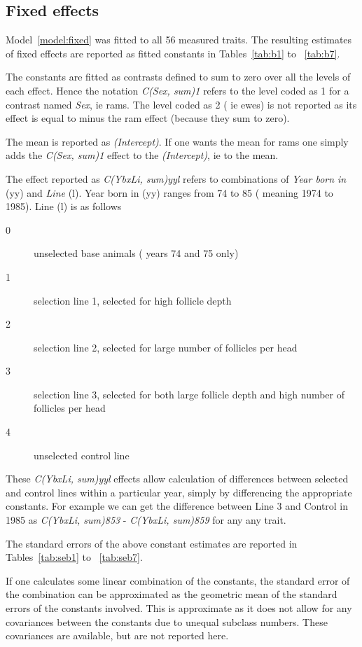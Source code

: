 \documentclass[titlepage]{article}  %
\begin{document}
\subsection{Fixed effects}
Model~\ref{model:fixed} was fitted to all 56 measured traits. The resulting estimates of fixed effects are reported as fitted constants in Tables~\ref{tab:b1} to ~\ref{tab:b7}.







 The constants are fitted as contrasts defined to sum to zero over all the levels of each effect. Hence the notation {\em C(Sex, sum)1} refers to the level coded as 1 for a contrast named {\em Sex}, ie rams. The level coded as 2 ( ie ewes) is not reported as its effect is equal to minus the ram effect (because they sum to zero).

The mean is reported as {\em (Intercept)}. If one wants the mean for rams one simply adds the {\em C(Sex, sum)1} effect to the {\em (Intercept)}, ie to the mean.

The effect reported as {\em C(YbxLi, sum)yyl} refers to combinations of {\em Year born in} (yy) and {\em Line} (l).  Year born in (yy) ranges from 74 to 85 ( meaning 1974 to 1985). Line (l) is as follows
\begin{description}
\item[0] unselected base animals ( years 74 and 75 only)
\item[1] selection line 1, selected for high follicle depth
\item[2] selection line 2, selected for large number of follicles per head
\item[3] selection line 3, selected for both large follicle depth and high number of follicles per head
\item[4] unselected control line
\end{description}

These {\em C(YbxLi, sum)yyl} effects allow calculation of differences between selected and control lines within a particular year, simply by differencing the appropriate constants. For example we can get the difference between Line 3 and Control in 1985 as {\em C(YbxLi, sum)853} - {\em C(YbxLi, sum)859} for any any trait. 

The standard errors of the above constant estimates are reported in Tables~\ref{tab:seb1} to ~\ref{tab:seb7}.








If one calculates some linear combination of the constants, the standard error of the combination can be approximated as the geometric mean of the standard errors of the constants involved. This is approximate as it does not allow for any covariances between the constants due to unequal subclass numbers. These covariances are available, but are not reported here.
\end{document}
